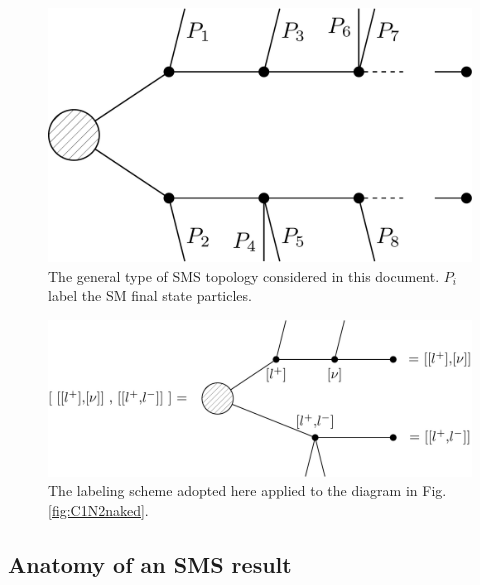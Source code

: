 \begin{figure}[h!t]
\begin{center}
\includegraphics[width=0.35\linewidth]{figures/GeneralTop.pdf}
\caption{The general type of SMS topology considered in this document. $P_i$ label the SM final state particles.}
\label{fig:GenSMSTop}
\end{center}
\end{figure}


\begin{figure}[h!t]
\begin{center}
\includegraphics[width=0.7\linewidth]{figures/C1N2labels.pdf}
\caption{The labeling scheme adopted here applied to the diagram in Fig.\ref{fig:C1N2naked}.}
\label{fig:SMSlabel}
\end{center}
\end{figure}



\subsection{Anatomy of an SMS result}
\label{ssec:smsstatistics}


